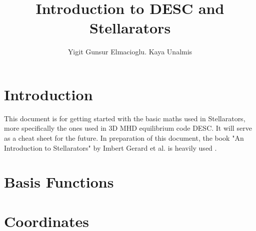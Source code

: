\documentclass{article}
\title{Introduction to DESC and Stellarators}
\author{Yigit Gunsur Elmacioglu. Kaya Unalmis}
\begin{document}
\onehalfspacing
\maketitle

\pagebreak
{\footnotesize \tableofcontents
                \listoftables
                \listoffigures
} 

\pagebreak
{}
\pagestyle{fancy}
\fancyhf{}
\fancyhead[L]{\textcolor{plasmalightgreen}{\rightmark}}  %
\fancyhead[R]{\textcolor{plasmadarkgreen}{\leftmark}}   %
\let\oldheadrule\headrule%
\renewcommand{\headrule}{\color{plasmagreen}\oldheadrule}%
\renewcommand{\headrulewidth}{0.5pt}



\section{Introduction}

This document is for getting started with the basic maths used in Stellarators, more specifically the ones used in 3D MHD equilibrium code DESC. It will serve as a cheat sheet for the future. In preparation of this document, the book "An Introduction to Stellarators" by Imbert Gerard et al. is heavily used \cite{imbert-gerard_introduction_nodate}.




\section{Basis Functions}


\pagebreak

\pagebreak






\pagebreak
\section{Coordinates}
\end{document}
